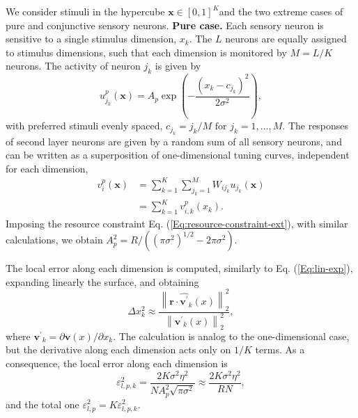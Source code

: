 \documentclass[a4paper]{article}%
\begin{document}
We consider stimuli in the hypercube $\mathbf{x} \in[0,1]^{K}$and the two
extreme cases of pure and conjunctive sensory neurons. \newline\newline%
\textbf{Pure case.} Each sensory neuron is sensitive to a single stimulus
dimension, $x_{k}$. The $L$ neurons are equally assigned to stimulus
dimensions, such that each dimension is monitored by $M = L/K$ neurons. The
activity of neuron $j_{k}$ is given by
\begin{equation}
u^{p}_{j_{k}}(\mathbf{x}) = A_{p} \exp\left(  -\frac{\left(  x_{k} - c_{j_{k}}
\right)  ^{2}}{2\sigma^{2}}\right)  ,
\end{equation}
with preferred stimuli evenly spaced, $c_{j_{k}} = j_{k}/M \text{ for }
j_{k}=1,...,M $. The responses of second layer neurons are given by a random
sum of all sensory neurons, and can be written as a superposition of
one-dimensional tuning curves, independent for each dimension,
\begin{equation}%
\begin{split}
v_{i}^{p}(\mathbf{x})  &  = \sum_{k=1}^{K} \sum_{j_{k}=1}^{M} W_{ij_{k}}
u_{j_{k}}(\mathbf{x})\\
&  = \sum_{k=1}^{K} v_{i,k}^{p}(x_{k}).
\end{split}
\end{equation}
Imposing the resource constraint Eq. (\ref{Eq:resource-constraint-ext}), with
similar calculations, we obtain $A_{p}^{2} = R/\left(  \left(  \pi\sigma
^{2}\right)  ^{1/2} - 2\pi\sigma^{2}\right)  $.

The local error along each dimension is computed, similarly to Eq.
(\ref{Eq:lin-exp}), expanding linearly the surface, and obtaining
\begin{equation}
\Delta x_{k}^{2} \approx\frac{\left\|  \mathbf{r}\cdot\hat{\mathbf{v^{\prime}%
}}_{k}(x)\right\|  _{2}^{2}}{\left\|  \mathbf{v^{\prime}}_{k}(x)\right\|
_{2}^{2}}, \label{Eq:MD-le}%
\end{equation}
where $\mathbf{v^{\prime}}_{k} = \partial\mathbf{v}(x)/\partial x_{k}$. The
calculation is analog to the one-dimensional case, but the derivative along
each dimension acts only on $1/K$ terms. As a consequence, the local error
along each dimension is
\begin{equation}
\varepsilon^{2}_{l,p,k} = \frac{2 K \sigma^{2} \eta^{2}}{N A_{p}^{2} \sqrt
{\pi\sigma^{2}}} \approx\frac{2 K \sigma^{2} \eta^{2}}{RN},
\label{Eq:multi-local-pure}%
\end{equation}
and the total one $\varepsilon^{2}_{l,p} = K\varepsilon_{l,p,k}^{2}$.
\end{document}
